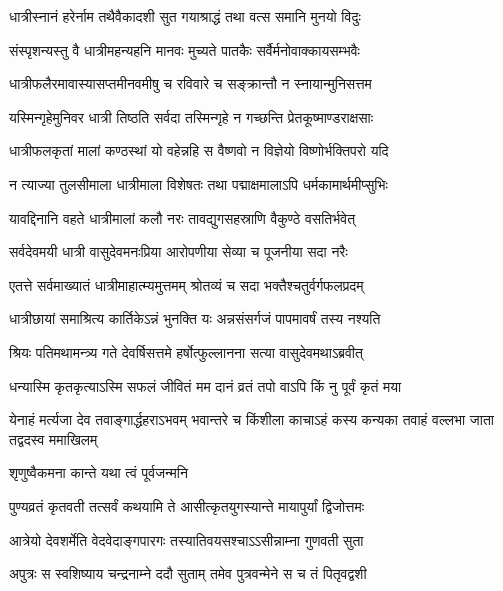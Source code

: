 \twolineshloka
{धात्रीस्नानं हरेर्नाम तथैवैकादशी सुत}
{गयाश्राद्धं तथा वत्स समानि मुनयो विदुः} %

\twolineshloka
{संस्पृशन्यस्तु वै धात्रीमहन्यहनि मानवः}
{मुच्यते पातकैः सर्वैर्मनोवाक्कायसम्भवैः} %

\twolineshloka
{धात्रीफलैरमावास्यासप्तमीनवमीषु च}
{रविवारे च सङ्क्रान्तौ न स्नायान्मुनिसत्तम} %

\twolineshloka
{यस्मिन्गृहेमुनिवर धात्री तिष्ठति सर्वदा}
{तस्मिन्गृहे न गच्छन्ति प्रेतकूष्माण्डराक्षसाः} %

\twolineshloka
{धात्रीफलकृतां मालां कण्ठस्थां यो वहेन्नहि}
{स वैष्णवो न विज्ञेयो विष्णोर्भक्तिपरो यदि} %

\twolineshloka
{न त्याज्या तुलसीमाला धात्रीमाला विशेषतः}
{तथा पद्माक्षमालाऽपि धर्मकामार्थमीप्सुभिः} %

\twolineshloka
{यावद्दिनानि वहते धात्रीमालां कलौ नरः}
{तावद्युगसहस्राणि वैकुण्ठे वसतिर्भवेत्} %

\twolineshloka
{सर्वदेवमयी धात्री वासुदेवमनःप्रिया}
{आरोपणीया सेव्या च पूजनीया सदा नरैः} %

\twolineshloka
{एतत्ते सर्वमाख्यातं धात्रीमाहात्म्यमुत्तमम्}
{श्रोतव्यं च सदा भक्तैश्चतुर्वर्गफलप्रदम्} %

\twolineshloka
{धात्रीछायां समाश्रित्य कार्तिकेऽन्नं भुनक्ति यः}
{अन्नसंसर्गजं पापमावर्षं तस्य नश्यति} %





\twolineshloka
{श्रियः पतिमथामन्त्र्य गते देवर्षिसत्तमे}
{हर्षोत्फुल्लानना सत्या वासुदेवमथाऽब्रवीत्} %


\twolineshloka
{धन्यास्मि कृतकृत्याऽस्मि सफलं जीवितं मम}
{दानं व्रतं तपो वाऽपि किं नु पूर्वं कृतं मया} %

\threelineshloka
{येनाहं मर्त्यजा देव तवाङ्गार्द्धहराऽभवम्}
{भवान्तरे च किंशीला काचाऽहं कस्य कन्यका}
{तवाहं वल्लभा जाता तद्वदस्व ममाखिलम्} %



\onelineshloka
{शृणुष्वैकमना कान्ते यथा त्वं पूर्वजन्मनि} %

\twolineshloka
{पुण्यव्रतं कृतवती तत्सर्वं कथयामि ते}
{आसीत्कृतयुगस्यान्ते मायापुर्यां द्विजोत्तमः} %

\twolineshloka
{आत्रेयो देवशर्मेति वेदवेदाङ्गपारगः}
{तस्यातिवयसश्चाऽऽसीन्नाम्ना गुणवती सुता} %

\twolineshloka
{अपुत्रः स स्वशिष्याय चन्द्रनाम्ने ददौ सुताम्}
{तमेव पुत्रवन्मेने स च तं पितृवद्वशी} %

